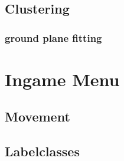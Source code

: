\subsection{Clustering}
\subsubsection{ground plane fitting}

\section{Ingame Menu}
\subsection{Movement}
\subsection{Labelclasses}
